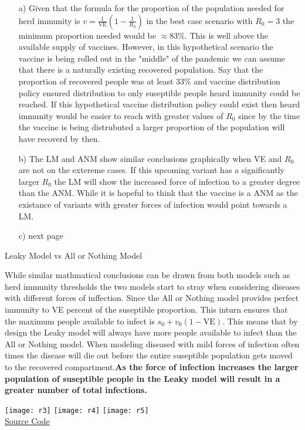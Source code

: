 \documentclass{report}
\begin{document}
\begin{itemize}
        \item[a)]{Given that the formula for the proportion of the population needed  for herd immunity is $v = \frac{1}{\text{VE}}(1-\frac{1}{R_0})$ in the best case scenario with $R_0 = 3$ the minimum proportion needed would be $\approx$83\%. This is well above the available supply of vaccines. However, in this hypothetical scenario the vaccine is being rolled out in the "middle" of the pandemic we can assume that there is a naturally existing recovered population. Say that the proportion of recovered people was at least 33\% and vaccine distribution policy ensured distribution to only suseptible people heard immunity could be reached. If this hypothetical vaccine distribution policy could exist then heard immunity would be easier to reach with greater values of $R_0$ since by the time the vaccine is being distrubuted a larger proportion of the population will have recoverd by then.}
        \item[b)]{The LM and ANM show similar conclusions graphically when VE and $R_0$ are not on the extereme cases. If this upcoming variant has a significantly larger $R_0$ the LM will show the increased force of infection to a greater degree than the ANM. While it is hopeful to think that the vaccine is a ANM as the existance of variants with greater forces of infection would point towards a LM.}
        \item[c)]{\sol next page}
\end{itemize}
\newpage
\begin{center}
        \huge{Leaky Model vs All or Nothing Model}
\end{center}
While similar mathmatical conclusions can be drawn from both models such as herd immunity thresholds the two models start to stray when considering diseases with different forces of inffection. Since the All or Nothing  model provides perfect immunity to VE percent of the suseptible proportion. This inturn ensures that the maximum people available to infect is $s_0 + v_0(1-\text{VE})$. This means that by design the Leaky model will always have more people available to infect than the All or Nothing model. When modeling diseased with mild forces of infection often times the disease will die out before the entire suseptible population gets moved to the recovered compartment.\textbf{As the force of infection increases the larger  population  of suseptible people in the Leaky model will result in a greater number of total infections.}
\begin{center}
        \texttt{[image: r3]}
        \texttt{[image: r4]}
        \texttt{[image: r5]}\\
        \href{https://github.com/TaiskeColclasure/csci4830_colclasure/blob/main/hw2/VaccineSim.py}{Source Code}
\end{center}
\end{document}

